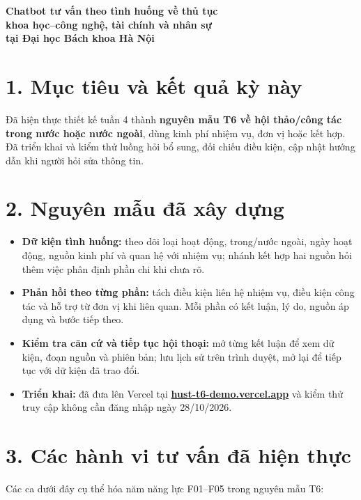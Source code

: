 \documentclass[12pt,a4paper]{article}
\begin{document}
\begin{center}
{\Large\bfseries Chatbot tư vấn theo tình huống về thủ tục\\
khoa học--công nghệ, tài chính và nhân sự\\
tại Đại học Bách khoa Hà Nội}
\end{center}

\section*{1. Mục tiêu và kết quả kỳ này}
Đã hiện thực thiết kế tuần 4 thành \textbf{nguyên mẫu T6 về hội thảo/công tác trong nước hoặc nước ngoài}, dùng kinh phí nhiệm vụ, đơn vị hoặc kết hợp. Đã triển khai và kiểm thử luồng hỏi bổ sung, đối chiếu điều kiện, cập nhật hướng dẫn khi người hỏi sửa thông tin.

\section*{2. Nguyên mẫu đã xây dựng}
\begin{itemize}
\item \textbf{Dữ kiện tình huống:} theo dõi loại hoạt động, trong/nước ngoài, ngày hoạt động, nguồn kinh phí và quan hệ với nhiệm vụ; nhánh kết hợp hai nguồn hỏi thêm việc phân định phần chi khi chưa rõ.
\item \textbf{Phản hồi theo từng phần:} tách điều kiện liên hệ nhiệm vụ, điều kiện công tác và hỗ trợ từ đơn vị khi liên quan. Mỗi phần có kết luận, lý do, nguồn áp dụng và bước tiếp theo.
\item \textbf{Kiểm tra căn cứ và tiếp tục hội thoại:} mở từng kết luận để xem dữ kiện, đoạn nguồn và phiên bản; lưu lịch sử trên trình duyệt, mở lại để tiếp tục với dữ kiện đã trao đổi.
\item \textbf{Triển khai:} đã đưa lên Vercel tại \href{https://hust-t6-demo.vercel.app}{\textbf{hust-t6-demo.vercel.app}} và kiểm thử truy cập không cần đăng nhập ngày 28/10/2026.
\end{itemize}

\section*{3. Các hành vi tư vấn đã hiện thực}
Các ca dưới đây cụ thể hóa năm năng lực F01--F05 trong nguyên mẫu T6:
\end{document}
